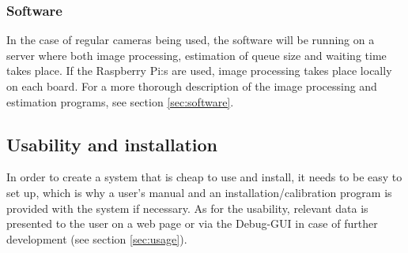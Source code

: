 \subsubsection{Software}
In the case of regular cameras being used, the software will be running on a server where both image processing, estimation of queue size and waiting time takes place. If the Raspberry Pi:s are used, image processing takes place locally on each board. For a more thorough description of the image processing and estimation programs, see section \ref{sec:software}.

\subsection{Usability and installation}
In order to create a system that is cheap to use and install, it needs to be easy to set up, which is why a user's manual and an installation/calibration program is provided with the system if necessary. As for the usability, relevant data is presented to the user on a web page or via the Debug-GUI in case of further development (see section \ref{sec:usage}). 

